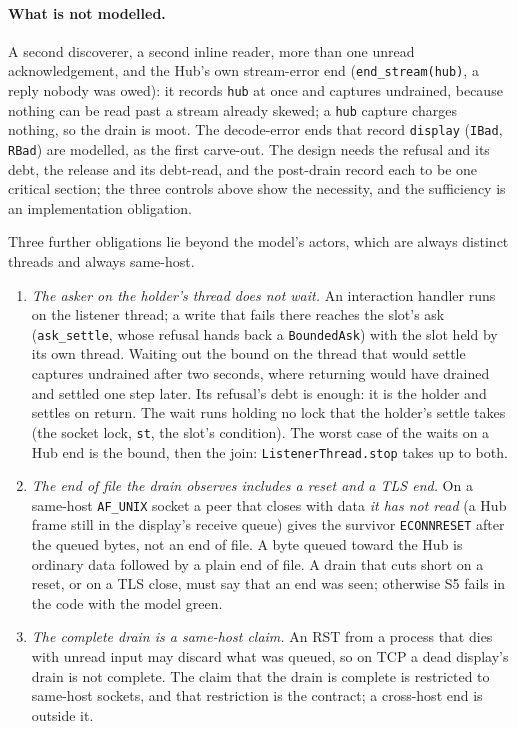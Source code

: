 \documentclass[a4paper,10pt,fleqn]{article}
\begin{document}
\paragraph{What is not modelled.}
A second discoverer, a second inline reader, more than one unread acknowledgement,
and the Hub's own stream-error end (\texttt{end\_stream(hub)}, a reply nobody was
owed): it records \texttt{hub} at once and captures undrained, because nothing can
be read past a stream already skewed; a \texttt{hub} capture charges nothing, so
the drain is moot.  The decode-error ends that record \texttt{display}
(\texttt{IBad}, \texttt{RBad}) are modelled, as the first carve-out.  The design
needs the refusal and its debt, the release and its debt-read, and the post-drain
record each to be one critical section; the three controls above show the
necessity, and the sufficiency is an implementation obligation.

Three further obligations lie beyond the model's actors, which are always
distinct threads and always same-host.
\begin{enumerate}
  \item \emph{The asker on the holder's thread does not wait.}  An interaction
    handler runs on the listener thread; a write that fails there reaches
    the slot's ask (\texttt{ask\_settle}, whose refusal hands back a
    \texttt{BoundedAsk}) with the slot held by its own thread.  Waiting out the
    bound on the thread that would settle captures undrained after two seconds,
    where returning would have drained and settled one step later.  Its refusal's
    debt is enough: it is the holder and settles on return.  The wait runs holding
    no lock that the holder's settle takes (the socket lock, \texttt{st}, the
    slot's condition).  The worst case of the waits on a Hub end is the bound,
    then the join: \texttt{ListenerThread.stop} takes up to both.
  \item \emph{The end of file the drain observes includes a reset and a TLS
    end.}  On a same-host \texttt{AF\_UNIX} socket a peer that closes with data
    \emph{it has not read} (a Hub frame still in the display's receive queue)
    gives the survivor \texttt{ECONNRESET} after the queued bytes, not an end of
    file.  A byte queued toward the Hub is ordinary data followed by a plain end
    of file.  A drain that cuts short on a reset, or on a TLS close, must say
    that an end was seen; otherwise S5 fails in the code with the model green.
  \item \emph{The complete drain is a same-host claim.}  An RST from a process
    that dies with unread input may discard what was queued, so on TCP a dead
    display's drain is not complete.  The claim that the drain is complete is
    restricted to same-host sockets, and that restriction is the contract; a
    cross-host end is outside it.
\end{enumerate}
\end{document}

